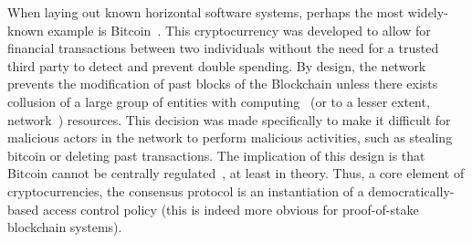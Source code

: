 
When laying out known horizontal software systems, perhaps the most
widely-known example is Bitcoin~\cite{nakamoto2019bitcoin}. This cryptocurrency
was developed to allow for financial transactions between two individuals
without the need for a trusted third party to detect and prevent double
spending. By design, the network prevents the modification of past blocks of
the Blockchain unless there exists collusion of a large group of entities with
computing~\cite{bonneau2018hostile} (or to a lesser extent,
network~\cite{heilman2015eclipse}) resources. This decision was made
specifically to make it difficult for malicious actors in the network to
perform malicious activities, such as stealing bitcoin or deleting past
transactions. The implication of this design is that Bitcoin cannot be
centrally regulated~\cite{tu2015rethinking}, at least in theory. Thus, a core
element of cryptocurrencies, the consensus protocol is an instantiation of a
democratically-based access control policy (this is indeed more obvious for
proof-of-stake blockchain systems).


